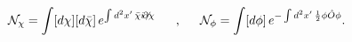 \begin{equation}
{\cal N}_\chi=\int [d\chi][d\bar{\chi}]\, e^{\int d^2x'\, \bar{\chi}i\not\!\partial \chi}
\makebox[.5in]{,}{\cal N}_\phi=\int [d\phi]\, e^{-\int d^2x'\, \frac{1}{2}\phi\hat{O}\phi}.
\end{equation}

